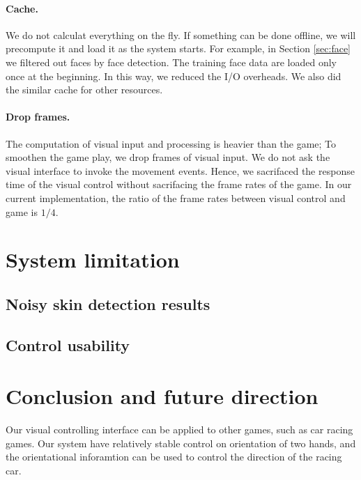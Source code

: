 \documentclass[10pt,twocolumn,letterpaper]{article}
\begin{document}
\paragraph{Cache.} We do not calculat everything on the fly. 
If something can be done offline, we will precompute it and 
load it as the system starts. For example, in Section 
\ref{sec:face} we filtered out faces by face detection. 
The training face data are loaded only once at the beginning. 
In this way, we reduced the I/O overheads. We also did the 
similar cache for other resources.

\paragraph{Drop frames.} The computation of visual input 
and processing is heavier than the game; To smoothen the game 
play, we drop frames of visual input. We do not ask 
the visual interface to invoke the movement events. 
Hence, we sacrifaced the response time of the visual control 
without sacrifacing the frame rates of the game. In our 
current implementation, the ratio of the frame rates between 
visual control and game is $1/4$.

\section{System limitation}

\subsection{Noisy skin detection results}

\subsection{Control usability}

\section{Conclusion and future direction}
Our visual controlling interface can be applied to other games, 
such as car racing games. Our system have relatively stable control on 
orientation of two hands, and the orientational inforamtion can be 
used to control the direction of the racing car.

{\small


}
\end{document}
